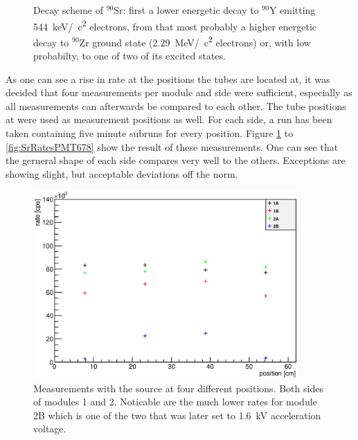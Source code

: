   \begin{figure}
  	\caption[Rate scanning with cobalt source]{}
  \end{figure}

  \begin{figure}
  \centering
  	\caption[Cobalt decay scheme]{Decay scheme of $^{90}$Sr: first a lower energetic decay to $^{90}$Y emitting \SI{544}{\kilo\electronvolt}/\SI{}{\square c} electrons, from that most probably a higher energetic decay to $^{90}$Zr ground state (\SI{2.29}{\mega\electronvolt}/\SI{}{\square c} electrons) or, with low probabilty, to one of two of its excited states.}
  \end{figure}

  As one can see a rise in rate at the positions the tubes are located at, it was decided that four measurements per module and side were sufficient, especially as all measurements can afterwards be compared to each other.
  The tube positions at  were used as measurement positions as well. For each side, a run has been taken containing five minute subruns for every position. Figure \ref{fig:SrRatesPMT12} to \ref{fig:SrRatesPMT678} show the result of these measurements. One can see that the gerneral shape of each side compares very well to the others. Exceptions are showing slight, but acceptable deviations off the norm.
  \begin{figure}
		\centering
		\includegraphics[width = 0.9\textwidth]{graphics/analysis/12final.eps}
  	\caption[Testing of muon modules with Sr source - Modules 1 \& 2]{Measurements with the source at four different positions. Both sides of modules 1 and 2. Noticable are the much lower rates for module 2B which is one of the two that was later set to \SI{1.6}{\kilo\volt} acceleration voltage. }
  	\label{fig:SrRatesPMT12}
  \end{figure}

